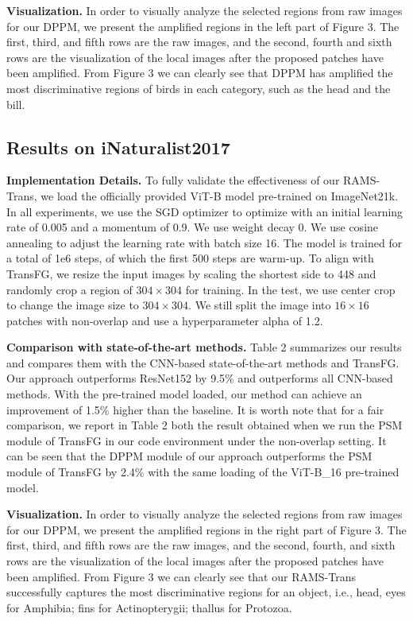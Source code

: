 \documentclass[sigconf]{acmart}
\begin{document}
\textbf{Visualization.}
    In order to visually analyze the selected regions from raw images for our DPPM, we present the amplified regions in the left part of Figure 3. The first, third, and fifth rows are the raw images, and the second, fourth and sixth rows are the visualization of the local images after the proposed patches have been amplified. From Figure 3 we can clearly see that DPPM has amplified the most discriminative regions of birds in each category, such as the head and the bill.

\subsection{Results on iNaturalist2017}


\textbf{Implementation Details.} To fully validate the effectiveness of our RAMS-Trans, we load the officially provided ViT-B model pre-trained on ImageNet21k. In all experiments, we use the SGD optimizer to optimize with an initial learning rate of 0.005 and a momentum of 0.9. We use weight decay 0. We use cosine annealing to adjust the learning rate with batch size 16. The model is trained for a total of 1e6 steps, of which the first 500 steps are warm-up. To align with TransFG, we resize the input images by scaling the shortest side to 448 and randomly crop a region of $304 \times 304$ for training. In the test, we use center crop to change the image size to $304 \times 304$. We still split the image into $16 \times 16$ patches with non-overlap and use a hyperparameter alpha of 1.2.

\textbf{Comparison with state-of-the-art methods.} Table 2 summarizes our results and compares them with the CNN-based state-of-the-art methods and TransFG. Our approach outperforms ResNet152 by 9.5\% and outperforms all CNN-based methods. With the pre-trained model loaded, our method can achieve an improvement of 1.5\% higher than the baseline. It is worth note that for a fair comparison, we report in Table 2 both the result obtained when we run the PSM module of TransFG in our code environment under the non-overlap setting. It can be seen that the DPPM module of our approach outperforms the PSM module of TransFG by 2.4\% with the same loading of the ViT-B\_16 pre-trained model.

\textbf{Visualization.}
In order to visually analyze the selected regions from raw images for our DPPM, we present the amplified regions in the right part of Figure 3. The first, third, and fifth rows are the raw images, and the second, fourth, and sixth rows are the visualization of the local images after the proposed patches have been amplified. From Figure 3 we can clearly see that our RAMS-Trans successfully captures the most discriminative regions for an object, i.e., head, eyes for Amphibia; fins for Actinopterygii; thallus for Protozoa. 
\end{document}
